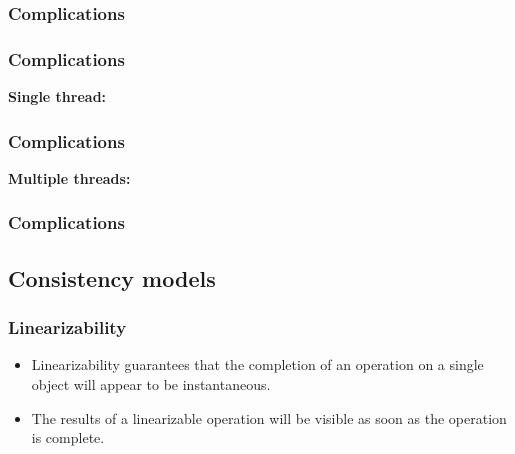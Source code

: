 \documentclass[aspectratio=1610]{beamer}
\begin{document}
  \begin{frame}
    \frametitle{Complications}

    \begin{itemize}

      \vfill

    \end{itemize}
  \end{frame}

  \begin{frame}
    \frametitle{Complications}
    \centering

    \textbf{Single thread:}
    \vfill
    \resizebox{0.9\linewidth}{!}{}
  \end{frame}

  \begin{frame}
    \frametitle{Complications}
    \centering

    \textbf{Multiple threads:}
    \vfill
    \resizebox{0.9\linewidth}{!}{}
  \end{frame}

  \begin{frame}
    \frametitle{Complications}

    \centering
    
  \end{frame}

  \subsection{Consistency models}

  \begin{frame}
    \frametitle{Linearizability}

    \begin{figure}
      \centering
      
    \end{figure}

    \vfill

    \begin{itemize}
      \item Linearizability guarantees that the completion of an operation on a single object will appear to be instantaneous.
      \item The results of a linearizable operation will be visible as soon as the operation is complete.
    \end{itemize}
  \end{frame}
\end{document}
